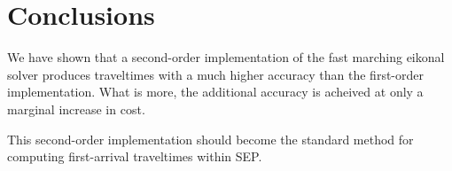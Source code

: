\section{Conclusions}
We have shown that a second-order implementation of the fast marching
eikonal solver produces traveltimes with a much higher accuracy than
the first-order implementation.  What is more, the additional accuracy
is acheived at only a marginal increase in cost.

\par
This second-order implementation should become the standard method for
computing first-arrival traveltimes within SEP.

  




